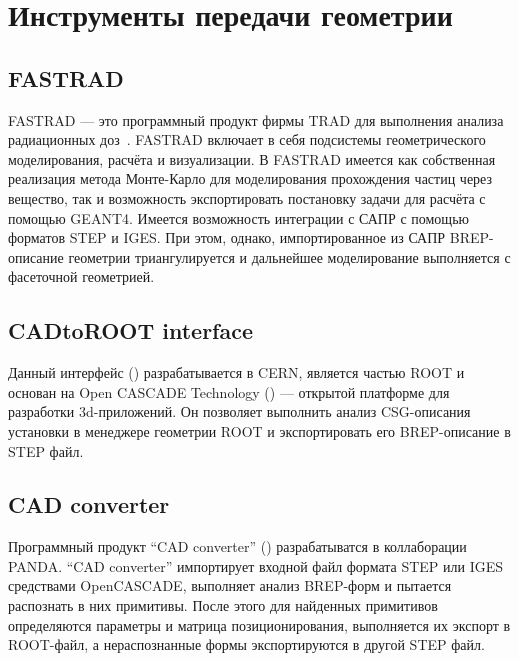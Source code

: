 \section{Инструменты передачи геометрии}\label{sec:ExistSols}

\subsection{FASTRAD}\label{sec:secFastrad}


FASTRAD --- это программный продукт фирмы TRAD для выполнения анализа радиационных доз~\cite{FASTRAD}.
FASTRAD включает в себя подсистемы геометрического моделирования, расчёта и визуализации.
В FASTRAD имеется как собственная реализация метода Монте-Карло для моделирования прохождения частиц через вещество, так и возможность экспортировать постановку задачи для расчёта с помощью GEANT4.
Имеется возможность интеграции с САПР с помощью форматов STEP и IGES. При этом, однако, импортированное из САПР BREP-описание геометрии триангулируется и дальнейшее моделирование выполняется с фасеточной геометрией.


\subsection{CADtoROOT interface}\label{sec:secCinzia}

Данный интерфейс (\cite{Cinzia}) разрабатывается в CERN, является частью ROOT и основан на Open CASCADE Technology (\cite{OCCtech}) --- открытой платформе для разработки 3d-приложений. Он позволяет выполнить анализ CSG-описания установки в менеджере геометрии ROOT и экспортировать его BREP-описание в STEP файл.

\subsection{CAD converter}\label{sec:secTobias}

Программный продукт ``CAD converter'' (\cite{Tobias}) разрабатыватся в коллаборации PANDA. ``CAD converter'' импортирует входной файл формата STEP или IGES средствами OpenCASCADE, выполняет анализ BREP-форм и пытается распознать в них примитивы. После этого для найденных примитивов определяются параметры и матрица позиционирования, выполняется их экспорт в ROOT-файл, а нераспознанные формы экспортируются в другой STEP файл.
